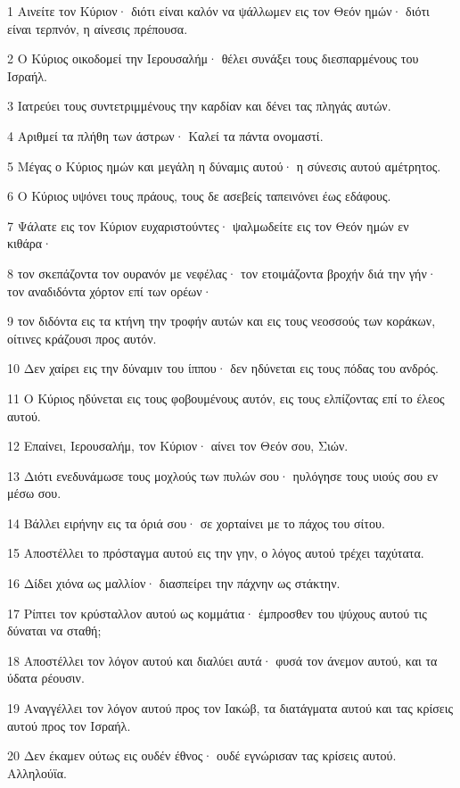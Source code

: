 \par 1 Αινείτε τον Κύριον· διότι είναι καλόν να ψάλλωμεν εις τον Θεόν ημών· διότι είναι τερπνόν, η αίνεσις πρέπουσα.
\par 2 Ο Κύριος οικοδομεί την Ιερουσαλήμ· θέλει συνάξει τους διεσπαρμένους του Ισραήλ.
\par 3 Ιατρεύει τους συντετριμμένους την καρδίαν και δένει τας πληγάς αυτών.
\par 4 Αριθμεί τα πλήθη των άστρων· Καλεί τα πάντα ονομαστί.
\par 5 Μέγας ο Κύριος ημών και μεγάλη η δύναμις αυτού· η σύνεσις αυτού αμέτρητος.
\par 6 Ο Κύριος υψόνει τους πράους, τους δε ασεβείς ταπεινόνει έως εδάφους.
\par 7 Ψάλατε εις τον Κύριον ευχαριστούντες· ψαλμωδείτε εις τον Θεόν ημών εν κιθάρα·
\par 8 τον σκεπάζοντα τον ουρανόν με νεφέλας· τον ετοιμάζοντα βροχήν διά την γήν· τον αναδιδόντα χόρτον επί των ορέων·
\par 9 τον διδόντα εις τα κτήνη την τροφήν αυτών και εις τους νεοσσούς των κοράκων, οίτινες κράζουσι προς αυτόν.
\par 10 Δεν χαίρει εις την δύναμιν του ίππου· δεν ηδύνεται εις τους πόδας του ανδρός.
\par 11 Ο Κύριος ηδύνεται εις τους φοβουμένους αυτόν, εις τους ελπίζοντας επί το έλεος αυτού.
\par 12 Επαίνει, Ιερουσαλήμ, τον Κύριον· αίνει τον Θεόν σου, Σιών.
\par 13 Διότι ενεδυνάμωσε τους μοχλούς των πυλών σου· ηυλόγησε τους υιούς σου εν μέσω σου.
\par 14 Βάλλει ειρήνην εις τα όριά σου· σε χορταίνει με το πάχος του σίτου.
\par 15 Αποστέλλει το πρόσταγμα αυτού εις την γην, ο λόγος αυτού τρέχει ταχύτατα.
\par 16 Δίδει χιόνα ως μαλλίον· διασπείρει την πάχνην ως στάκτην.
\par 17 Ρίπτει τον κρύσταλλον αυτού ως κομμάτια· έμπροσθεν του ψύχους αυτού τις δύναται να σταθή;
\par 18 Αποστέλλει τον λόγον αυτού και διαλύει αυτά· φυσά τον άνεμον αυτού, και τα ύδατα ρέουσιν.
\par 19 Αναγγέλλει τον λόγον αυτού προς τον Ιακώβ, τα διατάγματα αυτού και τας κρίσεις αυτού προς τον Ισραήλ.
\par 20 Δεν έκαμεν ούτως εις ουδέν έθνος· ουδέ εγνώρισαν τας κρίσεις αυτού. Αλληλούϊα.

